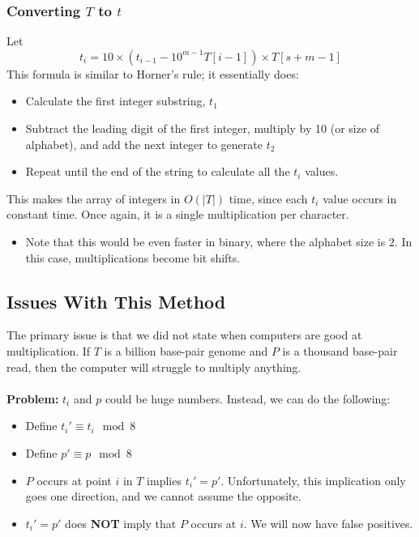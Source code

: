\documentclass[10pt]{article}
\begin{document}
\subsubsection*{Converting $T$ to $t$}
Let
\[t_i = 10 \times (t_{i - 1} - 10^{m - 1} T[i - 1]) \times T[s + m - 1]\]
This formula is similar to Horner's rule; it essentially does:
\begin{itemize}
	\item Calculate the first integer substring, $t_1$
	\item Subtract the leading digit of the first integer, multiply by 10 (or size of alphabet), and add the next integer to generate $t_2$
	\item Repeat until the end of the string to calculate all the $t_i$ values.
\end{itemize}
This makes the array of integers in $O(|T|)$ time, since each $t_i$ value occurs in constant time.  Once again, it is a single multiplication per character.
\begin{itemize}
	\item Note that this would be even faster in binary, where the alphabet size is $2$.  In this case, multiplications become bit shifts.
\end{itemize}

\subsection*{Issues With This Method}
The primary issue is that we did not state when computers are good at multiplication.  If $T$ is a billion base-pair genome and $P$ is a thousand base-pair read, then the computer will struggle to multiply anything.\\\\
\textbf{Problem:} $t_i$ and $p$ could be huge numbers.  Instead, we can do the following:
\begin{itemize}
	\item Define $t_i' \equiv t_i \mod 8$
	\item Define $p' \equiv p \mod 8$
	\item $P$ occurs at point $i$ in $T$ implies $t_i' = p'$.  Unfortunately, this implication only goes one direction, and we cannot assume the opposite.
	\item $t_i' = p'$ does \textbf{NOT} imply that $P$ occurs at $i$.  We will now have false positives.
\end{itemize}
\end{document}
